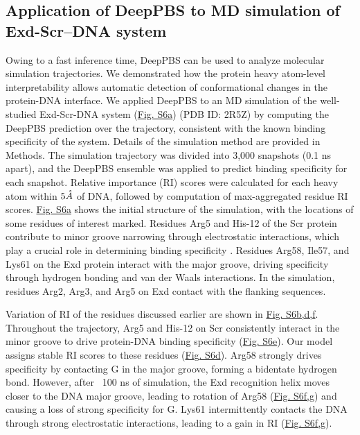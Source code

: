 \subsection{Application of DeepPBS to MD simulation of Exd-Scr–DNA system}

Owing to a fast inference time, DeepPBS can be used to analyze molecular simulation trajectories. We demonstrated how the protein heavy atom-level interpretability allows automatic detection of conformational changes in the protein-DNA interface. We applied DeepPBS to an MD simulation of the well-studied Exd-Scr-DNA system (\hyperref[fig:pdnaS6]{Fig. S6a}) (PDB ID: 2R5Z)\citep{Abe2015, Chiu2022, Ghoshdastidar2022, Slattery2011} by computing the DeepPBS prediction over the trajectory, consistent with the known binding specificity \citep{Abe2015} of the system. Details of the simulation method are provided in Methods. The
simulation trajectory was divided into 3,000 snapshots (0.1 ns apart), and the DeepPBS ensemble was applied to predict binding specificity for each snapshot. Relative importance (RI) scores were calculated for each heavy atom within $5 \AA$  of DNA, followed by computation of max-aggregated residue RI scores. \hyperref[fig:pdnaS6]{Fig. S6a} shows the initial structure of the simulation, with the locations of some residues of interest marked. Residues Arg5 and His-12 of the Scr protein contribute to minor groove narrowing through electrostatic interactions, which play a crucial role in determining binding specificity \citep{Joshi2007}. 
Residues Arg58, Ile57, and Lys61 on the Exd protein interact with the major groove, driving specificity through hydrogen bonding and van der Waals interactions. In the simulation, residues Arg2, Arg3, and Arg5 on Exd contact with the flanking sequences. 

Variation of RI of the residues discussed earlier are shown in \hyperref[fig:pdnaS6]{Fig. S6b,d,f}. Throughout the trajectory, Arg5 and His-12 on Scr consistently interact in the minor groove to drive protein-DNA binding specificity (\hyperref[fig:pdnaS6]{Fig. S6e}). Our model assigns stable RI scores to these residues (\hyperref[fig:pdnaS6]{Fig. S6d}). Arg58 strongly drives specificity by contacting G in the major groove, forming a bidentate hydrogen bond. However, after ~100 ns of simulation, the Exd recognition helix moves closer to the DNA major groove, leading to rotation of Arg58 (\hyperref[fig:pdnaS6]{Fig. S6f,g}) and causing a loss of strong specificity for G. Lys61 intermittently contacts the DNA through strong electrostatic interactions, leading to a gain in RI (\hyperref[fig:pdnaS6]{Fig. S6f,g}). 


